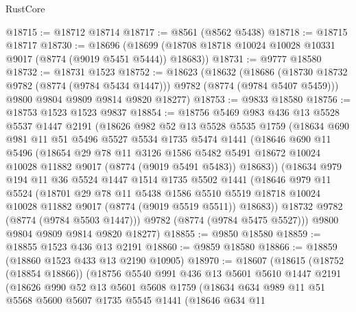 \begin{lexlean}{RustCore}
\begin{coremodule}
@18715 := @18712 @18714
@18717 := @8561 (@8562 @5438)
@18718 := @18715 @18717
@18730 := @18696
    (@18699 (@18708 @18718 @10024 @10028 @10331 @9017 (@8774 (@9019 @5451 @5444)) @18683))
@18731 := @9777 @18580
@18732 := @18731 @1523
@18752 := @18623
    (@18632
      (@18686 (@18730 @18732 @9782 (@8774 (@9784 @5434 @1447))) @9782 (@8774 (@9784 @5407 @5459)))
      @9800
      @9804
      @9809
      @9814
      @9820
      @18277)
@18753 := @9833 @18580
@18756 := @18753 @1523 @1523 @9837
@18854 := @18756
    @5469
    @983
    @436
    @13
    @5528
    @5537
    @1447
    @2191
    (@18626
      @982
      @52
      @13
      @5528
      @5535
      @1759
      (@18634
        @690
        @981
        @11
        @51
        @5496
        @5527
        @5534
        @1735
        @5474
        @1441
        (@18646
          @690
          @11
          @5496
          (@18654
            @29
            @78
            @11
            @3126
            @1586
            @5482
            @5491
            @18672
            @10024
            @10028
            @11882
            @9017
            (@8774 (@9019 @5491 @5483))
            @18683))
        (@18634
          @979
          @194
          @11
          @36
          @5524
          @1447
          @1514
          @1735
          @5502
          @1441
          (@18646
            @979
            @11
            @5524
            (@18701
              @29
              @78
              @11
              @5438
              @1586
              @5510
              @5519
              @18718
              @10024
              @10028
              @11882
              @9017
              (@8774 (@9019 @5519 @5511))
              @18683))
          @18732
          @9782
          (@8774 (@9784 @5503 @1447)))
        @9782
        (@8774 (@9784 @5475 @5527)))
      @9800
      @9804
      @9809
      @9814
      @9820
      @18277)
@18855 := @9850 @18580
@18859 := @18855 @1523 @436 @13 @2191
@18860 := @9859 @18580
@18866 := @18859 (@18860 @1523 @433 @13 @2190 @10905)
@18970 := @18607
    (@18615
      (@18752 (@18854 @18866))
      (@18756
        @5540
        @991
        @436
        @13
        @5601
        @5610
        @1447
        @2191
        (@18626
          @990
          @52
          @13
          @5601
          @5608
          @1759
          (@18634
            @634
            @989
            @11
            @51
            @5568
            @5600
            @5607
            @1735
            @5545
            @1441
            (@18646
              @634
              @11

\end{coremodule}
\end{lexlean}
